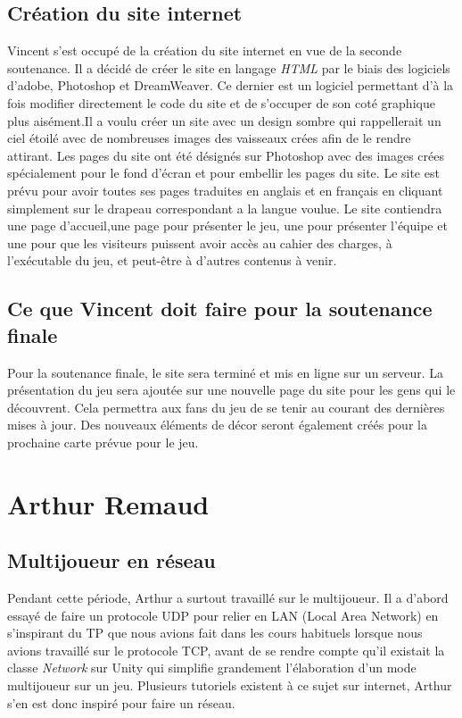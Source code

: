 \documentclass[10pt, titlepage]{report}
\begin{document}
\subsection{Création du site internet}
Vincent s'est occupé de la création du site internet en vue de la seconde soutenance. Il a décidé de créer le site en langage \textit{HTML} par le biais des logiciels d'adobe, Photoshop et DreamWeaver. Ce dernier est un logiciel permettant d'à la fois modifier directement le code du site et de s'occuper de son coté graphique plus aisément.Il a voulu créer un site avec un design sombre qui rappellerait un ciel étoilé avec de nombreuses images des vaisseaux crées afin de le rendre attirant. Les pages du site ont été désignés sur Photoshop avec des images crées spécialement pour le fond d'écran et pour embellir les pages du site. Le site est prévu pour avoir toutes ses pages traduites en anglais et en français en cliquant simplement sur le drapeau correspondant a la langue voulue. Le site contiendra une page d'accueil,une page pour présenter le jeu, une pour présenter l'équipe et une pour que les visiteurs puissent avoir accès au cahier des charges, à l'exécutable du jeu, et peut-être à d'autres contenus à venir.\\

\subsection{Ce que Vincent doit faire pour la soutenance finale}
Pour la soutenance finale, le site sera terminé et mis en ligne sur un serveur. La présentation du jeu sera ajoutée sur une nouvelle page du site pour les gens qui le découvrent. Cela permettra aux fans du jeu de se tenir au courant des dernières mises à jour. Des nouveaux éléments de décor seront également créés pour la prochaine carte prévue pour le jeu.\\

\section{Arthur Remaud}

\subsection{Multijoueur en réseau}
Pendant cette période, Arthur a surtout travaillé sur le multijoueur. Il a d'abord essayé de faire un protocole UDP pour relier en LAN (Local Area Network) en s'inspirant du TP que nous avions fait dans les cours habituels lorsque nous avions travaillé sur le protocole TCP, avant de se rendre compte qu'il existait la classe \textit{Network} sur Unity qui simplifie grandement l'élaboration d'un mode multijoueur sur un jeu. Plusieurs tutoriels existent à ce sujet sur internet, Arthur s'en est donc inspiré pour faire un réseau.\\
\end{document}
